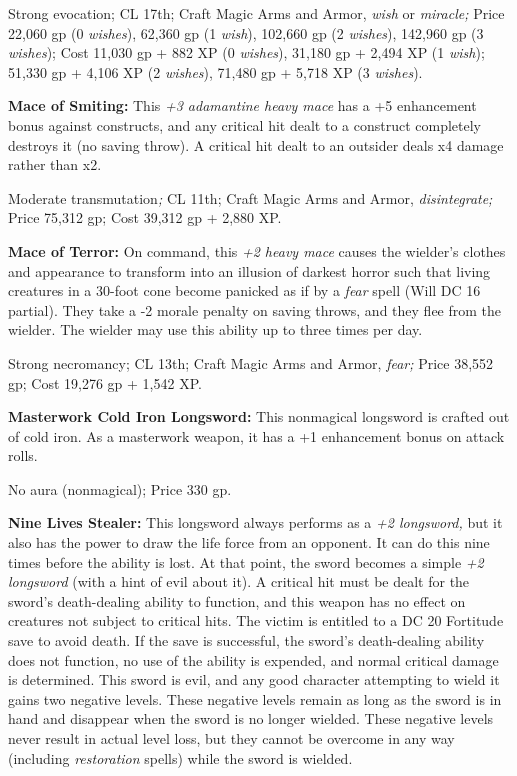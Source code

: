 Strong evocation; CL 17th; Craft Magic Arms and Armor, \textit{wish }or \textit{miracle; 
}Price 22,060 gp (0 \textit{wishes}), 62,360 gp (1 \textit{wish}), 102,660 gp (2 
\textit{wishes}), 142,960 gp (3 \textit{wishes}); Cost 11,030 gp + 882 XP (0 \textit{wishes}), 
31,180 gp + 2,494 XP (1 \textit{wish}); 51,330 gp + 4,106 XP (2 \textit{wishes}), 
71,480 gp + 5,718 XP (3 \textit{wishes}).

\textbf{Mace of Smiting: }This \textit{+3 adamantine heavy mace }has a +5 enhancement 
bonus against constructs, and any critical hit dealt to a construct completely 
destroys it (no saving throw). A critical hit dealt to an outsider deals x4 damage 
rather than x2.

Moderate transmutation\textit{; }CL 11th; Craft Magic Arms and Armor, \textit{disintegrate; 
}Price 75,312 gp; Cost 39,312 gp + 2,880 XP.

\textbf{Mace of Terror:} On command, this \textit{+2 heavy mace }causes the wielder's 
clothes and appearance to transform into an illusion of darkest horror such that 
living creatures in a 30-foot cone become panicked as if by a \textit{fear }spell 
(Will DC 16 partial). They take a -2 morale penalty on saving throws, and they 
flee from the wielder. The wielder may use this ability up to three times per day. 

Strong necromancy; CL 13th; Craft Magic Arms and Armor, \textit{fear; }Price 38,552 
gp; Cost 19,276 gp + 1,542 XP.

\textbf{Masterwork Cold Iron Longsword:} This nonmagical longsword is crafted out 
of cold iron. As a masterwork weapon, it has a +1 enhancement bonus on attack rolls.

No aura (nonmagical); Price 330 gp.

\textbf{Nine Lives Stealer:} This longsword always performs as a \textit{+2 longsword, 
}but it also has the power to draw the life force from an opponent. It can do this 
nine times before the ability is lost. At that point, the sword becomes a simple 
\textit{+2 longsword }(with a hint of evil about it). A critical hit must be dealt 
for the sword's death-dealing ability to function, and this weapon has no effect 
on creatures not subject to critical hits. The victim is entitled to a DC 20 Fortitude 
save to avoid death. If the save is successful, the sword's death-dealing ability 
does not function, no use of the ability is expended, and normal critical damage 
is determined. This sword is evil, and any good character attempting to wield it 
gains two negative levels. These negative levels remain as long as the sword is 
in hand and disappear when the sword is no longer wielded. These negative levels 
never result in actual level loss, but they cannot be overcome in any way (including 
\textit{restoration }spells) while the sword is wielded.

